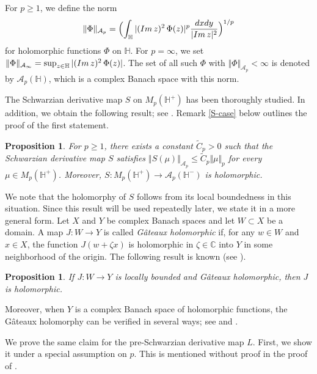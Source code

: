 \documentclass[amstex,12pt,reqno]{amsart}
\newtheorem{proposition}[theorem]{Proposition}
\theoremstyle{definition}
\begin{document}
For $p \geq 1$, we define the norm
\begin{equation}\label{Ap}
\Vert \Phi\Vert_{{\mathcal A}_p}=\Bigl(\int_{\mathbb H} |({\rm Im}\,z)^2\, \Phi(z)|^p \frac{dxdy}{|{\rm Im}\,z|^2}\Bigr)^{1/p}
\end{equation}
for holomorphic functions $\Phi$ on $\mathbb H$. For $p=\infty$,
we set $\Vert \Phi\Vert_{{\mathcal A}_\infty}=\sup_{z \in \mathbb H}|({\rm Im}\,z)^2\, \Phi(z)|$.
The set of all such $\Phi$ with $\Vert \Phi\Vert_{{\mathcal A}_p}<\infty$
is denoted by ${\mathcal A}_p(\mathbb H)$, which is a complex Banach space with this norm. 

The Schwarzian derivative map $S$ on $M_p(\mathbb H^+)$ has been thoroughly studied. In addition,
we obtain the following result; see \cite[Lemma 3.2]{WM-1}. 
Remark \ref{S-case} below outlines the proof of the first statement.

\begin{proposition}\label{S-holo}
For $p \geq 1$, there exists a constant $\widetilde C_p>0$ such that
the Schwarzian derivative map $S$ satisfies $\Vert S(\mu)\Vert_{\mathcal A_p} \leq \widetilde C_p \Vert \mu \Vert_p$
for every $\mu \in M_p(\mathbb H^+)$. Moreover,
$S:M_p(\mathbb H^+) \to {\mathcal A}_p(\mathbb H^-)$ 
is holomorphic.
\end{proposition}

We note that the holomorphy of $S$ follows from its local boundedness in this situation.
Since this result will be used repeatedly later, we state it in a more general form.
Let $X$ and $Y$ be complex Banach spaces and let $W \subset X$ be a domain.
A map $J:W \to Y$ is called {\it G\^ateaux holomorphic} if, for any $w \in W$ and $x \in X$,
the function $J(w+\zeta x)$ is holomorphic in $\zeta \in \mathbb C$ into $Y$ in some neighborhood of the origin.
The following result is known (see \cite[Theorem 14.9]{Ch}).

\begin{proposition}\label{G-holomorphic}
If $J:W \to Y$ is locally bounded and G\^ateaux holomorphic, then $J$ is holomorphic.
\end{proposition}

Moreover, when $Y$ is a complex Banach space of holomorphic functions, 
the G\^ateaux holomorphy can be verified in several ways; see \cite[Lemma V.5.1]{Le} and \cite[Lemma 6.1]{WM-2}.

We prove the same claim for the pre-Schwarzian derivative map $L$.
First, we show it under a special assumption on $p$. This is mentioned without proof
in the proof of \cite[Theorem 6.10]{WM-4}.
\end{document}

